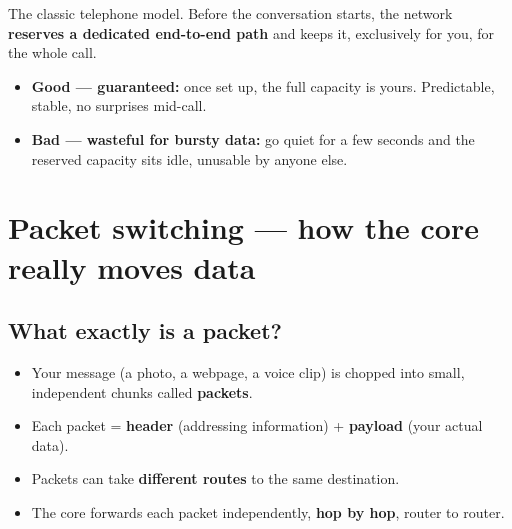 The classic telephone model. Before the conversation starts, the network \textbf{reserves a dedicated end-to-end path} and keeps it, exclusively for you, for the whole call.

\begin{center}
\end{center}

\begin{itemize}
  \item \textbf{Good --- guaranteed:} once set up, the full capacity is yours. Predictable, stable, no surprises mid-call.
  \item \textbf{Bad --- wasteful for bursty data:} go quiet for a few seconds and the reserved capacity sits idle, unusable by anyone else.
\end{itemize}

\section{Packet switching --- how the core really moves data}

\subsection{What exactly is a packet?}
\begin{itemize}
  \item Your message (a photo, a webpage, a voice clip) is chopped into small, independent chunks called \textbf{packets}.
  \item Each packet = \textbf{header} (addressing information) + \textbf{payload} (your actual data).
  \item Packets can take \textbf{different routes} to the same destination.
  \item The core forwards each packet independently, \textbf{hop by hop}, router to router.
\end{itemize}


